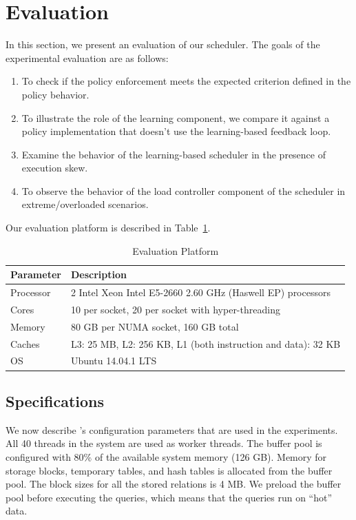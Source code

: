 \section{Evaluation}\label{sec:eval}
In this section, we present an evaluation of our scheduler. 
The goals of the experimental evaluation are as follows:
\begin{enumerate}
\item To check if the policy enforcement meets the expected criterion defined in 
the policy behavior. 
\item To illustrate the role of the learning component, we compare it against a policy implementation that doesn't use the learning-based feedback loop. 
\item Examine the behavior of the learning-based scheduler in the presence of 
execution skew. 
\item To observe the behavior of the load controller component of the scheduler in extreme/overloaded scenarios.
\end{enumerate}

Our evaluation platform is described in Table~\ref{table:hardware}.

\begin{table}[]
\centering
\begin{tabular}{|p{1cm}|p{6.9cm}|}
\hline
\textbf{Parameter} & \textbf{Description} \\ \hline
Processor & 2 Intel Xeon Intel E5-2660 2.60 GHz (Haswell EP) processors\\ \hline
Cores & 10 per socket, 20 per socket with hyper-threading \\ \hline
Memory & 80 GB per NUMA socket, 160 GB total \\ \hline
Caches & L3: 25 MB, L2: 256 KB, L1 (both instruction and data): 32 KB \\ \hline
OS & Ubuntu 14.04.1 LTS \\ \hline
\end{tabular}
\caption{Evaluation Platform}
\label{table:hardware}
\vspace{-2.7em}
\end{table}
\subsection{\sys{} Specifications}
We now describe \sys{}'s configuration parameters that are  used in the experiments. 
All 40 threads in the system are used as worker threads.
The buffer pool is configured with 80\% of the available system memory (126 GB). 
Memory for storage blocks, temporary tables, and hash tables is allocated from the buffer 
pool.
The block sizes for all the stored relations is 4 MB.
We preload the buffer pool before executing the queries, which means that the queries run on ``hot'' data. 

